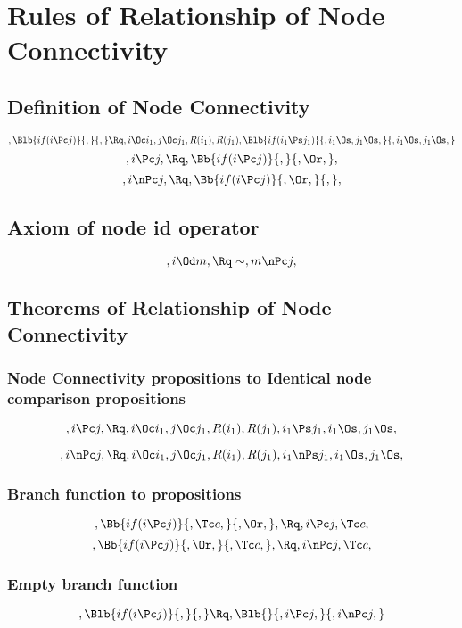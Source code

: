 \chapter{Rules of Relationship of Node Connectivity}

\section{Definition of Node Connectivity}
\[,\Blb{if(i \Pc j)}{,}{,} \Rq , i \Oc i_1, j \Oc j_1, R(i_1), R(j_1), \Blb{if(i_1 \Ps j_1)}{, i_1 \Os, j_1 \Os,}{, i_1 \Os, j_1 \Os,}\]
\bigskip
\bigskip
\[, i \Pc j, \Rq , \Bb{if(i \Pc j)}{,}{, \Or,},\]
\bigskip
\bigskip
\[, i \nPc j, \Rq , \Bb{if(i \Pc j)}{, \Or,}{,},\]
\bigskip
\bigskip


\section{Axiom of node id operator} 
\[, i \Od m, \Rq \sim, m \nPc j, \]



\bigskip
\bigskip
\section{Theorems of Relationship of Node Connectivity}
\subsection{  Node Connectivity propositions to Identical node comparison propositions}
\[,i \Pc j, \Rq , i \Oc i_1, j \Oc j_1, R(i_1), R(j_1), i_1 \Ps j_1, i_1 \Os, j_1 \Os,  \]


\[,i \nPc j, \Rq , i \Oc i_1, j \Oc j_1, R(i_1), R(j_1), i_1 \nPs j_1, i_1 \Os, j_1 \Os,  \]

\subsection{Branch function to propositions}
\[,\Bb{if(i \Pc j)}{,\Tc c,}{,\Or,}, \Rq ,i \Pc j, \Tc c,\]
\bigskip
\bigskip
\[,\Bb{if(i \Pc j)}{,\Or,}{,\Tc c,}, \Rq ,i \nPc j, \Tc c,\]
\bigskip
\bigskip


\subsection{Empty branch function} 
\[, \Blb{if(i \Pc j)}{,}{,} \Rq , \Blb{}{, i \Pc j,}{, i \nPc j,}\]

